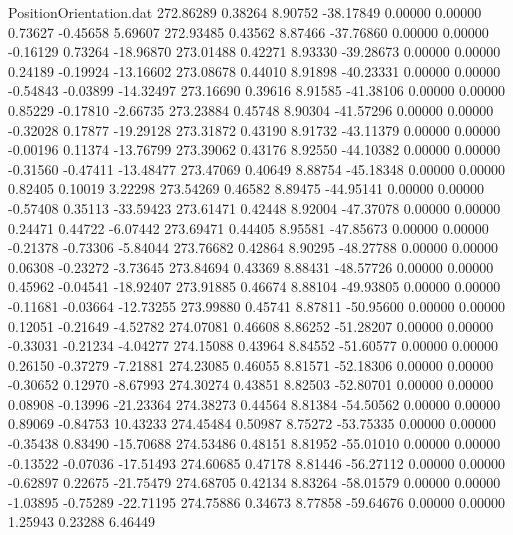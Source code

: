 \begin{filecontents}{PositionOrientation.dat}
 272.86289    0.38264    8.90752   -38.17849    0.00000    0.00000    0.73627   -0.45658    5.69607
 272.93485    0.43562    8.87466   -37.76860    0.00000    0.00000   -0.16129    0.73264  -18.96870
 273.01488    0.42271    8.93330   -39.28673    0.00000    0.00000    0.24189   -0.19924  -13.16602
 273.08678    0.44010    8.91898   -40.23331    0.00000    0.00000   -0.54843   -0.03899  -14.32497
 273.16690    0.39616    8.91585   -41.38106    0.00000    0.00000    0.85229   -0.17810   -2.66735
 273.23884    0.45748    8.90304   -41.57296    0.00000    0.00000   -0.32028    0.17877  -19.29128
 273.31872    0.43190    8.91732   -43.11379    0.00000    0.00000   -0.00196    0.11374  -13.76799
 273.39062    0.43176    8.92550   -44.10382    0.00000    0.00000   -0.31560   -0.47411  -13.48477
 273.47069    0.40649    8.88754   -45.18348    0.00000    0.00000    0.82405    0.10019    3.22298
 273.54269    0.46582    8.89475   -44.95141    0.00000    0.00000   -0.57408    0.35113  -33.59423
 273.61471    0.42448    8.92004   -47.37078    0.00000    0.00000    0.24471    0.44722   -6.07442
 273.69471    0.44405    8.95581   -47.85673    0.00000    0.00000   -0.21378   -0.73306   -5.84044
 273.76682    0.42864    8.90295   -48.27788    0.00000    0.00000    0.06308   -0.23272   -3.73645
 273.84694    0.43369    8.88431   -48.57726    0.00000    0.00000    0.45962   -0.04541  -18.92407
 273.91885    0.46674    8.88104   -49.93805    0.00000    0.00000   -0.11681   -0.03664  -12.73255
 273.99880    0.45741    8.87811   -50.95600    0.00000    0.00000    0.12051   -0.21649   -4.52782
 274.07081    0.46608    8.86252   -51.28207    0.00000    0.00000   -0.33031   -0.21234   -4.04277
 274.15088    0.43964    8.84552   -51.60577    0.00000    0.00000    0.26150   -0.37279   -7.21881
 274.23085    0.46055    8.81571   -52.18306    0.00000    0.00000   -0.30652    0.12970   -8.67993
 274.30274    0.43851    8.82503   -52.80701    0.00000    0.00000    0.08908   -0.13996  -21.23364
 274.38273    0.44564    8.81384   -54.50562    0.00000    0.00000    0.89069   -0.84753   10.43233
 274.45484    0.50987    8.75272   -53.75335    0.00000    0.00000   -0.35438    0.83490  -15.70688
 274.53486    0.48151    8.81952   -55.01010    0.00000    0.00000   -0.13522   -0.07036  -17.51493
 274.60685    0.47178    8.81446   -56.27112    0.00000    0.00000   -0.62897    0.22675  -21.75479
 274.68705    0.42134    8.83264   -58.01579    0.00000    0.00000   -1.03895   -0.75289  -22.71195
 274.75886    0.34673    8.77858   -59.64676    0.00000    0.00000    1.25943    0.23288    6.46449

\end{filecontents}
